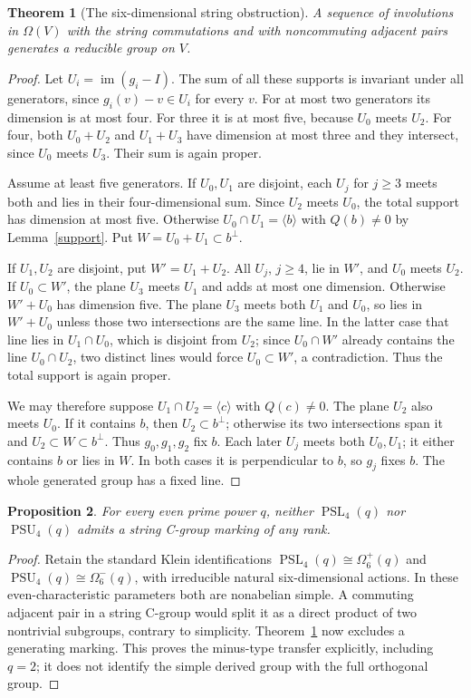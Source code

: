 \documentclass[11pt,a4paper]{article}
\newtheorem{theorem}{Theorem}\newtheorem{lemma}[theorem]{Lemma}\newtheorem{proposition}[theorem]{Proposition}
\newcommand{\gen}[1]{\langle #1\rangle}\newcommand{\im}{\operatorname{im}}\newcommand{\GL}{\operatorname{GL}}\newcommand{\PGL}{\operatorname{PGL}}
\begin{document}
\begin{theorem}[The six-dimensional string obstruction]\label{six}
A sequence of involutions in $\Omega(V)$ with the string commutations and
with noncommuting adjacent pairs generates a reducible group on $V$.
\end{theorem}
\begin{proof}
Let $U_i=\im(g_i-I)$. The sum of all these supports is invariant under all
generators, since $g_i(v)-v\in U_i$ for every $v$. For at most two generators
its dimension is at most four. For three it is at most five, because $U_0$
meets $U_2$. For four, both $U_0+U_2$ and $U_1+U_3$ have dimension at most
three and they intersect, since $U_0$ meets $U_3$. Their sum is again proper.

Assume at least five generators. If $U_0,U_1$ are disjoint, each $U_j$
for $j\ge3$ meets both and lies in their four-dimensional sum. Since
$U_2$ meets $U_0$, the total support has dimension at most five.
Otherwise $U_0\cap U_1=\gen b$ with $Q(b)\ne0$ by
Lemma~\ref{support}. Put $W=U_0+U_1\subset b^\perp$.

If $U_1,U_2$ are disjoint, put $W'=U_1+U_2$.
All $U_j$, $j\ge4$, lie in $W'$, and $U_0$ meets $U_2$.
If $U_0\subset W'$, the plane $U_3$ meets $U_1$ and adds at most one
dimension. Otherwise $W'+U_0$ has dimension five. The plane $U_3$ meets
both $U_1$ and $U_0$, so lies in $W'+U_0$ unless those two intersections
are the same line. In the latter case that line lies in $U_1\cap U_0$,
which is disjoint from $U_2$; since $U_0\cap W'$ already contains the
line $U_0\cap U_2$, two distinct lines would force $U_0\subset W'$,
a contradiction. Thus the total support is again proper.

We may therefore suppose $U_1\cap U_2=\gen c$ with $Q(c)\ne0$.
The plane $U_2$ also meets $U_0$. If it contains $b$, then $U_2\subset b^\perp$;
otherwise its two intersections span it and $U_2\subset W\subset b^\perp$.
Thus $g_0,g_1,g_2$ fix $b$. Each later $U_j$ meets both $U_0,U_1$;
it either contains $b$ or lies in $W$. In both cases it is perpendicular
to $b$, so $g_j$ fixes $b$. The whole generated group has a fixed line.
\end{proof}

\begin{proposition}\label{four}
For every even prime power $q$, neither $\operatorname{PSL}_4(q)$ nor
$\operatorname{PSU}_4(q)$ admits a string C-group marking of any rank.
\end{proposition}
\begin{proof}
Retain the standard Klein identifications
$\operatorname{PSL}_4(q)\cong\Omega^+_6(q)$ and
$\operatorname{PSU}_4(q)\cong\Omega^-_6(q)$, with irreducible natural
six-dimensional actions. In these even-characteristic parameters both are
nonabelian simple. A commuting adjacent pair in a string C-group would split
it as a direct product of two nontrivial subgroups, contrary to simplicity.
Theorem~\ref{six} now excludes a generating marking. This proves the minus-type
transfer explicitly, including $q=2$; it does not identify the simple derived
group with the full orthogonal group.
\end{proof}
\end{document}

